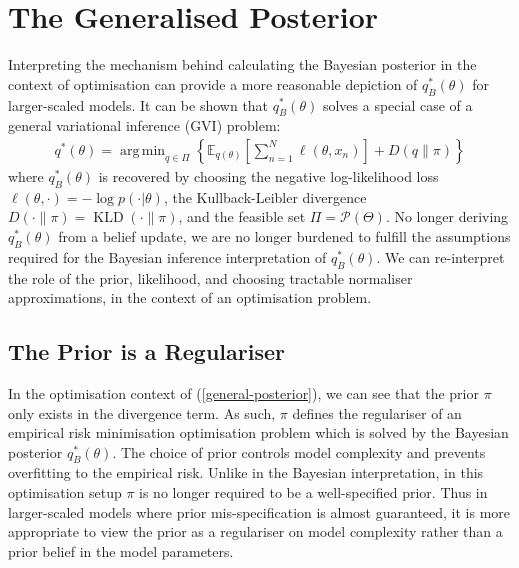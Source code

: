 \documentclass[twoside,11pt]{article}
\newcommand{\KLD}{\operatorname{KLD}}
\DeclareMathOperator*{\argmin}{arg\,min}
\begin{document}
\section{The Generalised Posterior \cite{knoblauch2022optimization}}
Interpreting the mechanism behind calculating the Bayesian posterior in the context of optimisation can provide a more reasonable depiction of $q_B^*(\theta)$ for larger-scaled models. It can be shown that $q_B^*(\theta)$ solves a special case of a general variational inference (GVI) problem:
\begin{align}
q^*(\theta) = \argmin_{q \in \Pi} \left\{ \mathbb{E}_{q(\theta)}\left[\sum_{n=1}^N \ell(\theta, x_n)\right] + D(q\|\pi)\right\}
\label{general-posterior}
\end{align}
where $q_B^*(\theta)$ is recovered by choosing the negative log-likelihood loss $\ell(\theta, \cdot) = -\log p(\cdot | \theta)$, the Kullback-Leibler divergence $D(\cdot \| \pi) = \KLD(\cdot \| \pi)$, and the feasible set $\Pi = \mathcal{P}(\Theta)$. No longer deriving $q_B^*(\theta)$ from a belief update, we are no longer burdened to fulfill the assumptions required for the Bayesian inference interpretation of $q_B^*(\theta)$. We can re-interpret the role of the prior, likelihood, and choosing tractable normaliser approximations, in the context of an optimisation problem.

\subsection{The Prior is a Regulariser}
In the optimisation context of (\ref{general-posterior}), we can see that the prior $\pi$ only exists in the divergence term. As such, $\pi$ defines the regulariser of an empirical risk minimisation optimisation problem which is solved by the Bayesian posterior $q_B^*(\theta)$. The choice of prior controls model complexity and prevents overfitting to the empirical risk. Unlike in the Bayesian interpretation, in this optimisation setup $\pi$ is no longer required to be a well-specified prior. Thus in larger-scaled models where prior mis-specification is almost guaranteed, it is more appropriate to view the prior as a regulariser on model complexity rather than a prior belief in the model parameters.
\end{document}
